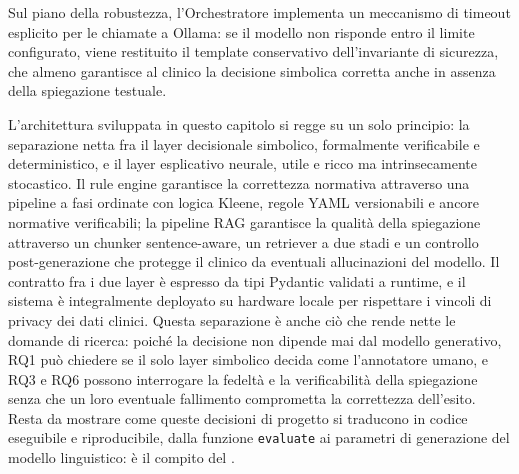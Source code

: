 Sul piano della robustezza, l'Orchestratore implementa un meccanismo di
timeout esplicito per le chiamate a Ollama: se il modello non risponde
entro il limite configurato, viene restituito il template conservativo
dell'invariante di sicurezza, che almeno garantisce al clinico la decisione
simbolica corretta anche in assenza della spiegazione testuale.

L'architettura sviluppata in questo capitolo si regge su un solo principio:
la separazione netta fra il layer decisionale simbolico, formalmente
verificabile e deterministico, e il layer esplicativo neurale, utile e ricco
ma intrinsecamente stocastico. Il rule engine garantisce la correttezza
normativa attraverso una pipeline a fasi ordinate con logica Kleene, regole
YAML versionabili e ancore normative verificabili; la pipeline RAG garantisce
la qualità della spiegazione attraverso un chunker sentence-aware, un
retriever a due stadi e un controllo post-generazione che protegge il
clinico da eventuali allucinazioni del modello. Il contratto fra i due
layer è espresso da tipi Pydantic validati a runtime, e il sistema è
integralmente deployato su hardware locale per rispettare i vincoli di
privacy dei dati clinici. Questa separazione è anche ciò che rende
nette le domande di ricerca: poiché la decisione non dipende mai dal modello
generativo, RQ1 può chiedere se il solo layer simbolico decida come l'annotatore
umano, e RQ3 e RQ6 possono interrogare la fedeltà e la verificabilità della
spiegazione senza che un loro eventuale fallimento comprometta la correttezza
dell'esito. Resta da mostrare come queste decisioni di
progetto si traducono in codice eseguibile e riproducibile, dalla funzione
\texttt{evaluate} ai parametri di generazione del modello linguistico: è
il compito del .
